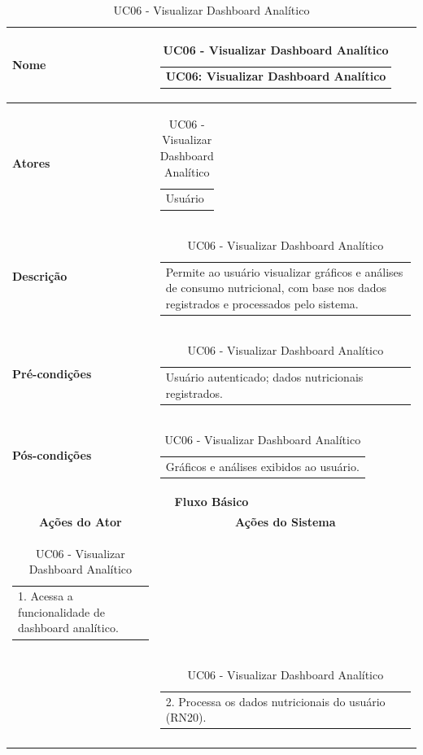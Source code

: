 \begin{longtable}[c]{|p{}|p{}|}
\caption{UC06 - Visualizar Dashboard Analítico}
\label{tab:uc06}\\
\hline
\multicolumn{1}{|p{0.48\textwidth}|}{\textbf{Nome}} &
  \begin{tabular}[c]{@{}p{}@{}}UC06: Visualizar Dashboard Analítico\end{tabular} \\ \hline
\endfirsthead
\endhead

\multicolumn{1}{|p{0.48\textwidth}|}{\textbf{Atores}} &
  \begin{tabular}[c]{@{}p{}@{}}Usuário\end{tabular} \\ \hline
\multicolumn{1}{|p{0.48\textwidth}|}{\textbf{Descrição}} &
  \begin{tabular}[c]{@{}p{}@{}}Permite ao usuário visualizar gráficos e análises de consumo nutricional, com base nos dados registrados e processados pelo sistema.\end{tabular} \\ \hline
\multicolumn{1}{|p{0.48\textwidth}|}{\textbf{Pré-condições}} &
  \begin{tabular}[c]{@{}p{}@{}}Usuário autenticado; dados nutricionais registrados.\end{tabular} \\ \hline
\multicolumn{1}{|p{0.48\textwidth}|}{\textbf{Pós-condições}} &
  \begin{tabular}[c]{@{}p{}@{}}Gráficos e análises exibidos ao usuário.\end{tabular} \\ \hline
\multicolumn{2}{|c|}{\textbf{Fluxo Básico}} \\ \hline
\multicolumn{1}{|c|}{\textbf{Ações do Ator}} &
  \multicolumn{1}{c|}{\textbf{Ações do Sistema}} \\ \hline
\multicolumn{1}{|p{0.48\textwidth}|}{\begin{tabular}[c]{@{}p{}@{}}1. Acessa a funcionalidade de dashboard analítico.\end{tabular}} & \\ \hline
\multicolumn{1}{|p{0.48\textwidth}|}{} &
  \begin{tabular}[c]{@{}p{}@{}}2. Processa os dados nutricionais do usuário (RN20).\end{tabular} \\ \hline
\multicolumn{1}{|p{0.48\textwidth}|}{} &

\end{longtable}
